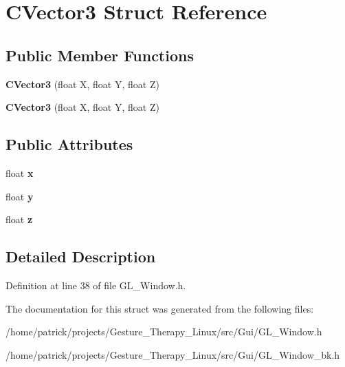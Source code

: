 \hypertarget{struct_c_vector3}{}\section{C\+Vector3 Struct Reference}
\label{struct_c_vector3}
\subsection*{Public Member Functions}
\begin{DoxyCompactItemize}
\item 
\mbox{\label{struct_c_vector3_af86632dc8f296182986627244d247400}} 
{\bfseries C\+Vector3} (float X, float Y, float Z)
\item 
\mbox{\label{struct_c_vector3_af86632dc8f296182986627244d247400}} 
{\bfseries C\+Vector3} (float X, float Y, float Z)
\end{DoxyCompactItemize}
\subsection*{Public Attributes}
\begin{DoxyCompactItemize}
\item 
\mbox{\label{struct_c_vector3_a06b092361b335f9971323be0ddf759b1}} 
float {\bfseries x}
\item 
\mbox{\label{struct_c_vector3_a20d0b1099477995b22a4f1407e41a7a1}} 
float {\bfseries y}
\item 
\mbox{\label{struct_c_vector3_a9dd3ce85f6aaa17ccc67bfe50a089b3a}} 
float {\bfseries z}
\end{DoxyCompactItemize}


\subsection{Detailed Description}


Definition at line 38 of file G\+L\+\_\+\+Window.\+h.



The documentation for this struct was generated from the following files\+:\begin{DoxyCompactItemize}
\item 
/home/patrick/projects/\+Gesture\+\_\+\+Therapy\+\_\+\+Linux/src/\+Gui/G\+L\+\_\+\+Window.\+h\item 
/home/patrick/projects/\+Gesture\+\_\+\+Therapy\+\_\+\+Linux/src/\+Gui/G\+L\+\_\+\+Window\+\_\+bk.\+h\end{DoxyCompactItemize}
